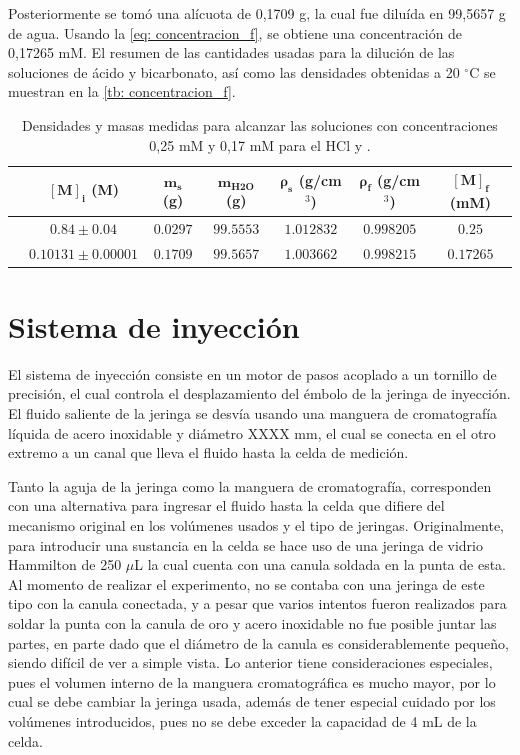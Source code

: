 	Posteriormente se tom\'o una al\'icuota de 0,1709 g, la cual fue dilu\'ida en 99,5657 g de agua. Usando la \autoref{eq: concentracion_f}, se obtiene una concentraci\'on de 0,17265 mM. El resumen de las cantidades usadas para la diluci\'on de las soluciones de \'acido y bicarbonato, as\'i como las densidades obtenidas a 20 $^\circ$C se muestran en la \autoref{tb: concentracion_f}.
	\begin{table}[h]
		\centering
		\caption{Densidades y masas medidas para alcanzar las soluciones con concentraciones 0,25 mM y 0,17 mM para el HCl y .}
		\begin{tabular}{c|cccccc}
			& $\mathbf{[M]_i}$ (M) & $\mathbf{m_s}$ (g) & $\mathbf{m_{\text{H2O}}}$ (g) & $\bm{\rho_s}$ (g/cm$^3$)& $\bm{\rho_f}$ (g/cm$^3$) & $\mathbf{[M]_f}$ (mM) \\
			\hline
			\textbf{\ce{HCl}} & $0.84 \pm 0.04$ & $0.0297$ & $99.5553$ & $1.012832$ & $0.998205$ & $0.25$ \\
			\textbf{\ce{KHCO3}} & $0.10131\pm 0.00001$ & $0.1709$ & $99.5657$ & $1.003662$ & $0.998215$ & $0.17265$ \\
			\hline
		\end{tabular}
		\label{tb: concentracion_f}
	\end{table}
	
\section{Sistema de inyecci\'on}
	El sistema de inyecci\'on consiste en un motor de pasos acoplado a un tornillo de precisión, el cual controla el desplazamiento del émbolo de la jeringa de inyección. El fluido saliente de la jeringa se desvía usando una manguera de cromatografía líquida de acero inoxidable y diámetro XXXX mm, el cual se conecta en el otro extremo a un canal que lleva el fluido hasta la celda de medición.
	
	Tanto la aguja de la jeringa como la manguera de cromatografía, corresponden con una alternativa para ingresar el fluido hasta la celda que difiere del mecanismo original en los volúmenes usados y el tipo de jeringas. Originalmente, para introducir una sustancia en la celda se hace uso de una jeringa de vidrio Hammilton de 250 $\mu$L la cual cuenta con una canula soldada en la punta de esta. Al momento de realizar el experimento, no se contaba con una jeringa de este tipo con la canula conectada, y a pesar que varios intentos fueron realizados para soldar la punta con la canula de oro y acero inoxidable no fue posible juntar las partes, en parte dado que el diámetro de la canula es considerablemente pequeño, siendo difícil de ver a simple vista. Lo anterior tiene consideraciones especiales, pues el volumen interno de la manguera cromatogr\'afica es mucho mayor, por lo cual se debe cambiar la jeringa usada, además de tener especial cuidado por los volúmenes introducidos, pues no se debe exceder la capacidad de 4 mL de la celda.
	

